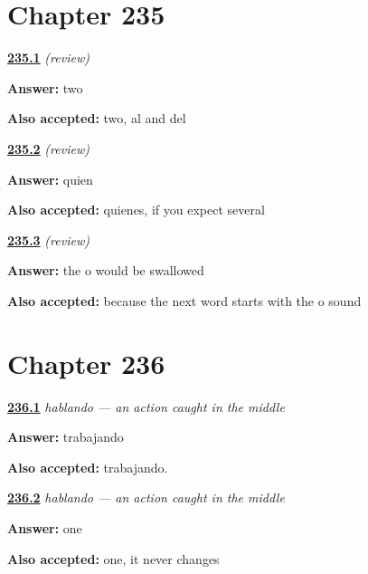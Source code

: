 \section*{Chapter 235}

\noindent\begin{minipage}[t]{\linewidth}
\raggedright
\hyperlink{review-ES-C61-repaso-juntores-count}{\textbf{235.1}} \emph{(review)}\par
\small \textbf{Answer:} two\par
\footnotesize \textbf{Also accepted:} two, al and del
\end{minipage}\par\medskip

\noindent\begin{minipage}[t]{\linewidth}
\raggedright
\hyperlink{review-ES-C61-repaso-juntores-who}{\textbf{235.2}} \emph{(review)}\par
\small \textbf{Answer:} quien\par
\footnotesize \textbf{Also accepted:} quienes, if you expect several
\end{minipage}\par\medskip

\noindent\begin{minipage}[t]{\linewidth}
\raggedright
\hyperlink{review-ES-C61-repaso-juntores-u}{\textbf{235.3}} \emph{(review)}\par
\small \textbf{Answer:} the o would be swallowed\par
\footnotesize \textbf{Also accepted:} because the next word starts with the o sound
\end{minipage}\par\medskip

\section*{Chapter 236}

\noindent\begin{minipage}[t]{\linewidth}
\raggedright
\hyperlink{review-ES-C62-hablando-make}{\textbf{236.1}} \emph{hablando — an action caught in the middle}\par
\small \textbf{Answer:} trabajando\par
\footnotesize \textbf{Also accepted:} trabajando.
\end{minipage}\par\medskip

\noindent\begin{minipage}[t]{\linewidth}
\raggedright
\hyperlink{review-ES-C62-hablando-agree}{\textbf{236.2}} \emph{hablando — an action caught in the middle}\par
\small \textbf{Answer:} one\par
\footnotesize \textbf{Also accepted:} one, it never changes
\end{minipage}\par\medskip

